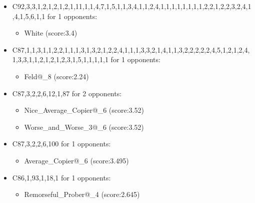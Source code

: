 \begin{appendices}
\begin{itemize}
        \item C92,3,3,1,2,1,2,1,2,1,11,1,1,4,7,1,5,1,1,3,4,1,1,2,4,1,1,1,1,1,1,1,1,2,2,1,2,2,3,2,4,1,4,1,5,6,1,1 for 1 opponents:
        \begin{multicols}{3}
            \begin{itemize}
                \item White (score:3.4)
            \end{itemize}
        \end{multicols}

        \item C87,1,1,3,1,1,2,2,1,1,1,3,1,3,2,1,2,2,4,1,1,1,3,3,2,1,4,1,1,3,2,2,2,2,2,4,5,1,2,1,2,4,1,3,3,1,1,2,1,2,1,2,3,1,5,1,1,1,1,1 for 1 opponents:
        \begin{multicols}{3}
            \begin{itemize}
                \item Feld@\_8 (score:2.24)
            \end{itemize}
        \end{multicols}

        \item C87,3,2,2,6,12,1,87 for 2 opponents:
        \begin{multicols}{3}
            \begin{itemize}
                \item Nice\_Average\_Copier@\_6 (score:3.52)
                \item Worse\_and\_Worse\_3@\_6 (score:3.52)
            \end{itemize}
        \end{multicols}

        \item C87,3,2,2,6,100 for 1 opponents:
        \begin{multicols}{3}
            \begin{itemize}
                \item Average\_Copier@\_6 (score:3.495)
            \end{itemize}
        \end{multicols}

        \item C86,1,93,1,18,1 for 1 opponents:
        \begin{multicols}{3}
            \begin{itemize}
                \item Remorseful\_Prober@\_4 (score:2.645)
            \end{itemize}
        \end{multicols}


\end{itemize}
\end{appendices}

